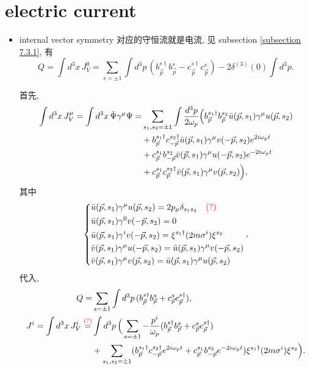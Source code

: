 \section{electric current}
\begin{itemize}
	\item internal vector symmetry 对应的守恒流就是电流, 见 subsection \ref{subsection 7.3.1}, 有
	\begin{equation}
		Q = \int d^3 x \, J_V^0 = \sum_{s = \pm 1} \int d^3 p \, (b^{s \dag}_{\vec{p}} b^s_{\vec{p}} - c^{s \dag}_{\vec{p}} c^s_{\vec{p}}) - 2 \delta^{(3)}(0) \int d^3 p.
	\end{equation}
	
	\begin{tcolorbox}[title=calculation:]
		首先,
		\begin{align}
			\int d^3 x \, J_V^\mu = \int d^3 x \, \bar{\Psi} \gamma^\mu \Psi =& \sum_{s_1, s_2 = \pm 1} \int \frac{d^3 p}{2 \omega_p} \Big( b^{s_1 \dag}_{\vec{p}} b^{s_2}_{\vec{p}} \bar{u}(\vec{p}, s_1) \gamma^\mu u(\vec{p}, s_2) \notag \\
			& + b^{s_1 \dag}_{\vec{p}} c^{s_2 \dag}_{- \vec{p}} \bar{u}(\vec{p}, s_1) \gamma^\mu v(- \vec{p}, s_2) e^{2 i \omega_p t} \notag \\
			& + c^{s_1}_{\vec{p}} b^{s_2}_{- \vec{p}} \bar{v}(\vec{p}, s_1) \gamma^\mu u(- \vec{p}, s_2) e^{- 2 i \omega_p t} \notag \\
			& + c^{s_1}_{\vec{p}} c^{s_2 \dag}_{\vec{p}} \bar{v}(\vec{p}, s_1) \gamma^\mu v(\vec{p}, s_2) \Big),
		\end{align}
		其中
		\begin{equation}
			\begin{dcases}
				\bar{u}(\vec{p}, s_1) \gamma^\mu u(\vec{p}, s_2) = 2 p_\mu \delta_{s_1 s_2} \quad \textcolor{red}{(?)} \\
				\bar{u}(\vec{p}, s_1) \gamma^0 v(- \vec{p}, s_2) = 0 \\
				\bar{u}(\vec{p}, s_1) \gamma^i v(- \vec{p}, s_2) = \xi^{s_1 \dag} (2 m \sigma^i) \xi^{s_2} \\
				\bar{v}(\vec{p}, s_1) \gamma^\mu u(- \vec{p}, s_2) = \bar{u}(\vec{p}, s_1) \gamma^\mu v(- \vec{p}, s_2) \\
				\bar{v}(\vec{p}, s_1) \gamma^\mu v(\vec{p}, s_2) = \bar{u}(\vec{p}, s_1) \gamma^\mu u(\vec{p}, s_2)
			\end{dcases},
		\end{equation}
		代入,
		\begin{align}
			Q =& \sum_{s = \pm 1} \int d^3 p \, (b^{s \dag}_{\vec{p}} b^s_{\vec{p}} + c^s_{\vec{p}} c^{s \dag}_{\vec{p}}), \\
			J^i = \int d^3 x \, J_V^i \overset{\textcolor{red}{(?)}}{=}& \int d^3 p \, \Big( \sum_{s = \pm 1} - \frac{p^i}{\omega_p} (b^{s \dag}_{\vec{p}} b^s_{\vec{p}} + c^s_{\vec{p}} c^{s \dag}_{\vec{p}}) \notag \\
			& + \sum_{s_1, s_2 = \pm 1} (b^{s_1 \dag}_{\vec{p}} c^{s_2 \dag}_{- \vec{p}} e^{2 i \omega_p t} + c^{s_1}_{\vec{p}} b^{s_2}_{- \vec{p}} e^{- 2 i \omega_p t}) \xi^{s_1 \dag} (2 m \sigma^i) \xi^{s_2} \Big).
		\end{align}
	\end{tcolorbox}
\end{itemize}

